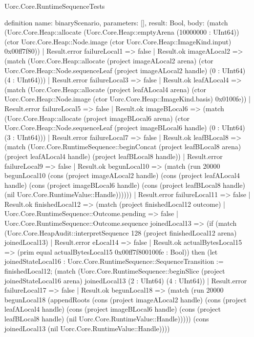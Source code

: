 \begin{lexlean}{Uorc.Core.RuntimeSequenceTests}
\begin{semanticmodule}
definition{
  name: binaryScenario,
  parameters: [],
  result: Bool,
  body: (match (Uorc.Core.Heap::allocate (Uorc.Core.Heap::emptyArena (10000000 : UInt64)) (ctor Uorc.Core.Heap::Node.image (ctor Uorc.Core.Heap::ImageKind.input) 0x00ff7f80))
    | Result.error failureLocal1 => false
    | Result.ok imageALocal2 => (match (Uorc.Core.Heap::allocate (project imageALocal2 arena) (ctor Uorc.Core.Heap::Node.sequenceLeaf (project imageALocal2 handle) (0 : UInt64) (4 : UInt64)))
      | Result.error failureLocal3 => false
      | Result.ok leafALocal4 => (match (Uorc.Core.Heap::allocate (project leafALocal4 arena) (ctor Uorc.Core.Heap::Node.image (ctor Uorc.Core.Heap::ImageKind.basis) 0x0100fe))
        | Result.error failureLocal5 => false
        | Result.ok imageBLocal6 => (match (Uorc.Core.Heap::allocate (project imageBLocal6 arena) (ctor Uorc.Core.Heap::Node.sequenceLeaf (project imageBLocal6 handle) (0 : UInt64) (3 : UInt64)))
          | Result.error failureLocal7 => false
          | Result.ok leafBLocal8 => (match (Uorc.Core.RuntimeSequence::beginConcat (project leafBLocal8 arena) (project leafALocal4 handle) (project leafBLocal8 handle))
            | Result.error failureLocal9 => false
            | Result.ok begunLocal10 => (match (run 20000 begunLocal10 (cons (project imageALocal2 handle) (cons (project leafALocal4 handle) (cons (project imageBLocal6 handle) (cons (project leafBLocal8 handle) (nil Uorc.Core.RuntimeValue::Handle))))))
              | Result.error failureLocal11 => false
              | Result.ok finishedLocal12 => (match (project finishedLocal12 outcome)
                | Uorc.Core.RuntimeSequence::Outcome.pending => false
                | Uorc.Core.RuntimeSequence::Outcome.sequence joinedLocal13 => (if (match (Uorc.Core.HeapAudit::interpretSequence 128 (project finishedLocal12 arena) joinedLocal13)
                  | Result.error eLocal14 => false
                  | Result.ok actualBytesLocal15 => (prim equal actualBytesLocal15 0x00ff7f800100fe : Bool)) then (let joinedStateLocal16 : Uorc.Core.RuntimeSequence::SequenceTransition := finishedLocal12; (match (Uorc.Core.RuntimeSequence::beginSlice (project joinedStateLocal16 arena) joinedLocal13 (2 : UInt64) (4 : UInt64))
                  | Result.error failureLocal17 => false
                  | Result.ok begunLocal18 => (match (run 20000 begunLocal18 (appendRoots (cons (project imageALocal2 handle) (cons (project leafALocal4 handle) (cons (project imageBLocal6 handle) (cons (project leafBLocal8 handle) (nil Uorc.Core.RuntimeValue::Handle))))) (cons joinedLocal13 (nil Uorc.Core.RuntimeValue::Handle))))
}
\end{semanticmodule}
\end{lexlean}
